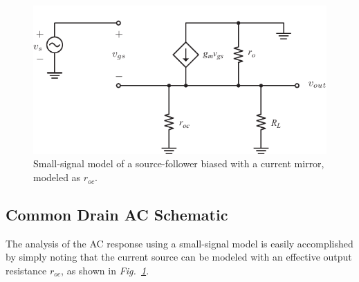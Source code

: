 \newpage
\begin{figure}[t]
\centering
\includegraphics[scale=1.25]{cd_amp_ss_av.pdf}
\caption{Small-signal model of a source-follower biased with a current mirror, modeled as $r_{oc}$.} \label{fig:cd_amp_ss_av.pdf}
\end{figure}
\subsection{Common Drain AC Schematic}
The analysis of the AC response using a small-signal model is easily accomplished by simply noting that the current source can be modeled with an effective output resistance $r_{oc}$, as shown in \emph{Fig.~\ref{fig:cd_amp_ss_av.pdf}}.
